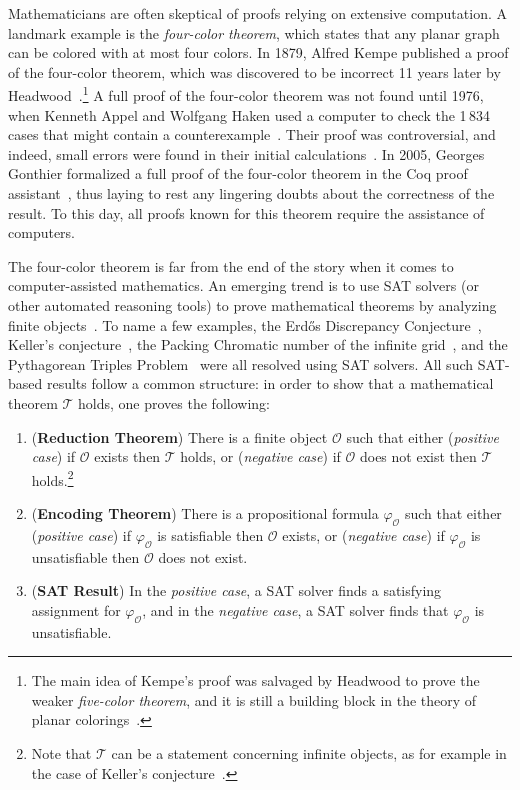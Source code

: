 Mathematicians are often skeptical of proofs relying on extensive computation.
A landmark example is the \emph{four-color theorem}, which states that any planar graph can be colored with at most four colors. 
In 1879, Alfred Kempe published a proof of the four-color theorem, which was discovered to be incorrect 11 years later by Headwood~\cite{Walters2004ItAT,Wilson2002GraphsCA}.\footnote{The main idea of Kempe's proof was salvaged by Headwood to prove the weaker \emph{five-color theorem}, and it is still a building block in the theory of planar colorings~\cite{Walters2004ItAT}.} 
A full proof of the four-color theorem was not found until 1976, when Kenneth Appel and Wolfgang Haken used a computer to check the 1\,834 cases that might contain a counterexample~\cite{appelFourColorProblem1978}.
Their proof was controversial, and indeed, small errors were found in their initial calculations~\cite{Walters2004ItAT,Wilson2002GraphsCA}.
In 2005, Georges Gonthier formalized a full proof of the four-color theorem in the \textsf{Coq} proof assistant~\cite{gonthierFourColourTheorem2008a}, thus laying to rest any lingering doubts about the correctness of the result.
To this day, all proofs known for this theorem require the assistance of computers.

The four-color theorem is far from the end of the story when it comes to computer-assisted mathematics.
An emerging trend is to use SAT solvers (or other automated reasoning tools) to prove mathematical theorems by analyzing finite objects~\cite{avigad2023mathematics}. 
To name a few examples, the Erd\H{o}s Discrepancy Conjecture~\cite{konev2014sat}, Keller's conjecture~\cite{brakensiek2023resolution}, the Packing Chromatic number of the infinite grid~\cite{Subercaseaux_Heule_2023}, and the Pythagorean Triples Problem~\cite{Heule_2016} were all resolved using SAT solvers.
All such SAT-based results follow a common structure: in order to show that a mathematical theorem $\mathcal{T}$ holds, one proves the following:
\begin{enumerate}
  \item (\textbf{Reduction Theorem}) There is a finite object $\mathcal{O}$ such that either (\emph{positive case}) if $\mathcal{O}$ exists then $\mathcal{T}$ holds, or (\emph{negative case}) if $\mathcal{O}$ does not exist then $\mathcal{T}$ holds.\footnote{Note that $\mathcal{T}$ can be a statement concerning infinite objects, as for example in the case of Keller's conjecture~\cite{brakensiek2023resolution}.}
  \item (\textbf{Encoding Theorem}) There is a propositional formula $\varphi_{\mathcal{O}}$ such that either (\emph{positive case}) if $\varphi_{\mathcal{O}}$ is satisfiable then $\mathcal{O}$ exists, or (\emph{negative case}) if $\varphi_{\mathcal{O}}$ is unsatisfiable then $\mathcal{O}$ does not exist.
  \item (\textbf{SAT Result}) In the \emph{positive case}, a SAT solver finds a satisfying assignment for $\varphi_{\mathcal{O}}$, and in the \emph{negative case}, a SAT solver finds that $\varphi_{\mathcal{O}}$ is unsatisfiable.
\end{enumerate}

